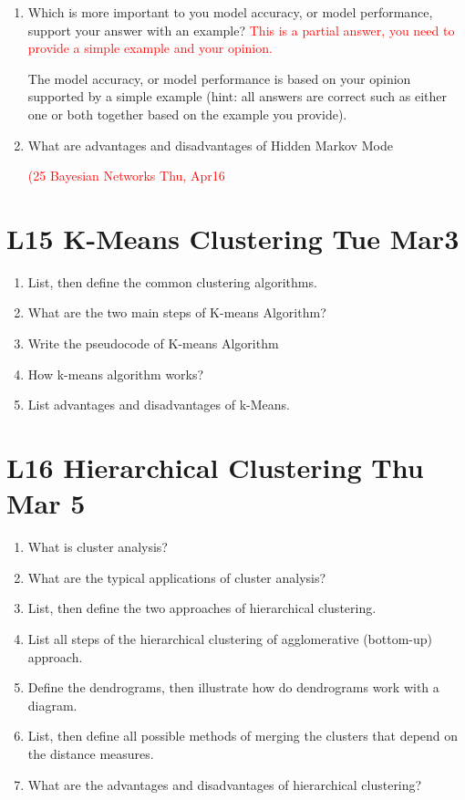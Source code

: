 \documentclass[12pt]{article}
\newenvironment{QandA}{\begin{enumerate}[label=\bfseries\arabic*.]\bfseries}
{\end{enumerate}}
\newenvironment{answered}{\par\normalfont\color{Sepia}}{}
\begin{document}
\begin{QandA}
\item Which is more important to you \textemdash{} model accuracy, or model
performance, support your answer with an example? \textcolor{red}{This is a
partial answer, you need to provide a simple example and your
opinion.}

\begin{answered} 
    The model accuracy, or model performance is based on your
    opinion supported by a simple example (hint: all answers are
    correct such as either one or both together based on the
    example you provide).
\end{answered}

\item What are advantages and disadvantages of Hidden Markov Mode
\begin{answered}
    \textcolor{red}{(25 Bayesian Networks \textemdash{} Thu, Apr16}
\end{answered}
\end{QandA}

\section*{L15 K-Means Clustering \textemdash{} Tue Mar3}
\begin{QandA}
    \item List, then define the common clustering algorithms.
    \item What are the two main steps of K-means Algorithm? 
    \item Write the pseudocode of K-means Algorithm
    \item How k-means algorithm works?
    \item List advantages and disadvantages of k-Means.
\end{QandA}

\section*{L16 Hierarchical Clustering \textemdash{} Thu Mar 5}
\begin{QandA}
    \item What is cluster analysis? 
    \item What are the typical applications of cluster analysis? 
    \item List, then define the two approaches of hierarchical clustering.
    \item List all steps of the hierarchical clustering of agglomerative (bottom-up) approach.
    \item Define the dendrograms, then illustrate how do dendrograms work with a diagram.
    \item List, then define all possible methods of merging the clusters that depend on the distance measures.
    \item What are the advantages and disadvantages of hierarchical clustering?
\end{QandA}
\end{document}
